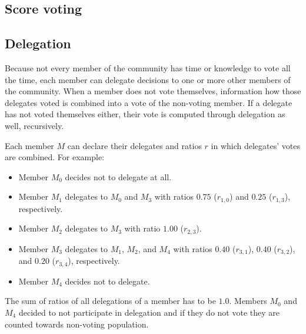 \documentclass{sigchi}
\begin{document}
\subsection{Score voting}


\subsection{Delegation}

Because not every member of the community has time or knowledge to vote all the time, each member can delegate
decisions to one or more other members of the community.
When a member does not vote themselves, information how those delegates voted is combined into a vote of
the non-voting member.
If a delegate has not voted themselves either, their vote is computed through delegation as well, recursively.

Each member $M$ can declare their delegates and ratios $r$ in which delegates' votes are combined. For example:

\begin{itemize}
\item Member $M_0$ decides not to delegate at all.
\item Member $M_1$ delegates to $M_0$ and $M_3$ with ratios $0.75$ ($r_{1,0}$) and $0.25$ ($r_{1,3}$), respectively.
\item Member $M_2$ delegates to $M_3$ with ratio $1.00$ ($r_{2,3}$).
\item Member $M_3$ delegates to $M_1$, $M_2$, and $M_4$ with ratios $0.40$ ($r_{3,1}$), $0.40$ ($r_{3,2}$), and $0.20$ ($r_{3,4}$), respectively.
\item Member $M_4$ decides not to delegate.
\end{itemize}

The sum of ratios of all delegations of a member has to be $1.0$.
Members $M_0$ and $M_4$ decided to not participate in delegation and if they do not vote they are
counted towards non-voting population.
\end{document}
